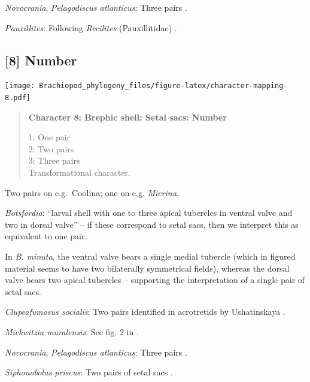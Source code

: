 \documentclass[openany]{book}
\begin{document}
\hypertarget{Novocrania-coding-7}{}
\emph{Novocrania}, \emph{Pelagodiscus atlanticus}: Three pairs
\citep{Carlson1995Phylogeneticrelationships}.

\hypertarget{Pauxillites-coding-7}{}
\emph{Pauxillites}: Following \emph{Recilites} (Pauxillitidae)
\citep{Dzik1978}.

\subsection*{{[}8{]} Number}\label{number}

\texttt{[image: Brachiopod\_phylogeny\_files/figure-latex/character-mapping-8.pdf]}

\begin{quote}
\textbf{Character 8: Brephic shell: Setal sacs: Number}

1: One pair\\
2: Two pairs\\
3: Three pairs\\
Transformational character.
\end{quote}

Two pairs on e.g.~Coolina; one on e.g. \emph{Micrina}.

\hypertarget{Botsfordia-coding-8}{}
\emph{Botsfordia}: ``larval shell with one to three apical tubercles in
ventral valve and two in dorsal valve''
\citep{Williams2000LinguliformeaCraniiformea} -- if these correspond to
setal sacs, then we interpret this as equivalent to one pair.

In \emph{B. minuta}, the ventral valve bears a single medial tubercle
(which in figured material seems to have two bilaterally symmetrical
fields), whereas the dorsal valve bears two apical tubercles
\citep{Li2004} -- supporting the interpretation of a single pair of
setal sacs.

\hypertarget{Clupeafumosus_socialis-coding-8}{}
\emph{Clupeafumosus socialis}: Two pairs identified in acrotretids by
Ushatinskaya \citeyearpar{Ushatinskaya2016Protegulumand}.

\hypertarget{Mickwitzia_muralensis-coding-8}{}
\emph{Mickwitzia muralensis}: See fig. 2 in
\citet{Balthasar2009Thebrachiopod}.

\hypertarget{Novocrania-coding-8}{}
\emph{Novocrania}, \emph{Pelagodiscus atlanticus}: Three pairs
\citep{Carlson1995Phylogeneticrelationships}.

\hypertarget{Siphonobolus_priscus-coding-8}{}
\emph{Siphonobolus priscus}: Two pairs of setal sacs
\citep{Popov2009Earlyontogeny}.
\end{document}
